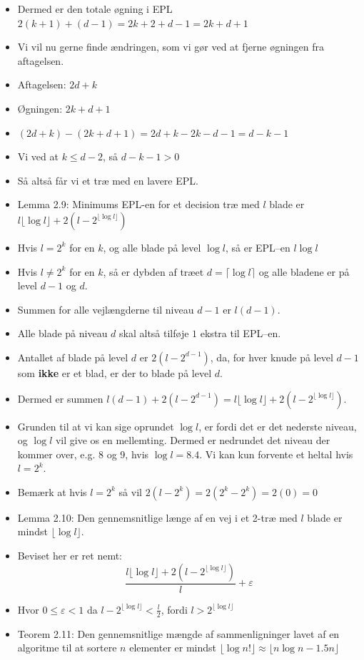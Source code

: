 \begin{frame}[allowframebreaks]
\begin{itemize}
	\item Dermed er den totale øgning i EPL $2(k+1)+(d-1)=2k+2+d-1=2k+d+1$
	\item Vi vil nu gerne finde ændringen, som vi gør ved at fjerne øgningen fra aftagelsen.
	\item Aftagelsen: $2d+k$
	\item Øgningen: $2k+d+1$
	\item $(2d+k)-(2k+d+1) = 2d+k-2k-d-1=d-k-1$
	\item Vi ved at $k \le d-2$, så $d-k-1 > 0 $
	\item Så altså får vi et træ med en lavere EPL.
	\item Lemma 2.9: Minimums EPL-en for et decision træ med $l$ blade er $l \lfloor \log l \rfloor + 2(l-2^{\lfloor \log l\rfloor })$
	\item Hvis $l = 2^{k}$  for en $k$, og alle blade på level $\log l$, så er EPL--en $l \log l$
	\item Hvis $l \ne 2^{k}$ for en $k$, så er dybden af træet $d = \lceil \log l \rceil$ og alle bladene er på level $d-1$ og $d$.
	\item Summen for alle vejlængderne til niveau $d-1$ er $l(d-1)$.
	\item Alle blade på niveau $d$ skal altså tilføje $1$ ekstra til EPL--en.
	\item Antallet af blade på level $d$ er $2(l-2^{d-1})$, da, for hver knude på level $d-1$ som \textbf{ikke} er et blad, er der to blade på level $d$.
	\item Dermed er summen $l(d-1)+2(l-2^{d-1}) = l \lfloor \log l \rfloor + 2(l-2^{\lfloor \log l \rfloor})$.
	\item Grunden til at vi kan sige oprundet $\log l$, er fordi det er det nederste niveau, og $\log l$ vil give os en mellemting. Dermed er nedrundet det niveau der kommer over, e.g. 8 og 9, hvis $\log l = 8.4$. Vi kan kun forvente et heltal hvis $l = 2^{k}$.
	\item Bemærk at hvis $l = 2^{k}$ så vil $2(l-2^{k}) = 2(2^{k}-2^{k}) = 2(0) = 0$
	\item Lemma 2.10: Den gennemsnitlige længe af en vej i et 2-træ med $l$ blade er mindst $\lfloor \log l \rfloor$.
	\item Beviset her er ret nemt:
		  \begin{equation}
\frac{l \lfloor \log l \rfloor + 2(l-2^{\lfloor \log l \rfloor})}{l} + \varepsilon
		  \end{equation}

	\item Hvor \(0 \le \varepsilon < 1\) da $l-2^{\lfloor \log l \rfloor }< \frac{l}{2}$, fordi $l > 2^{\lfloor \log l \rfloor}$
	\item Teorem 2.11: Den gennemsnitlige mængde af sammenligninger lavet af en algoritme til at sortere $n$ elementer er mindst $\lfloor \log n! \rfloor \approx \lfloor n \log n - 1.5n \rfloor$
  \end{itemize}
\end{frame}

